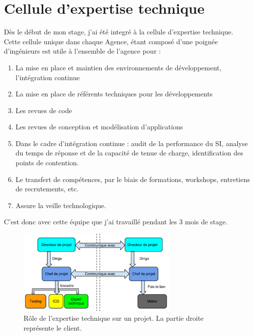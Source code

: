 \documentclass{report}
\begin{document}
\newpage






\section{Cellule d'expertise technique}

Dès le début de mon stage, j'ai été integré à la cellule d'expertise technique. Cette cellule unique dans chaque Agence, étant composé d'une poignée d'ingénieurs est utile à l'ensemble de l'agence pour : 

\begin{enumerate}
	\item La mise en place et maintien des environnements de développement, l'intégration continue
	\item La mise en place de référents techniques pour les développements
	\item Les revues de code 
	\item Les revues de conception et modélisation d’applications
	\item Dans le cadre d’intégration continue : audit de la performance du SI, analyse du temps de réponse et de la capacité de tenue de charge, identification des points de contention.
	\item Le transfert de compétences, par le biais de formations, workshops, entretiens de recrutements, etc.
	\item Assure la veille technologique. 
\end{enumerate}

C'est donc avec cette équipe que j'ai travaillé pendant les 3 mois de stage. 

\begin{figure}[h!]
	\centering
	\includegraphics[width=0.7\textwidth]{assets/expert_orga.png}
	\caption{Rôle de l'expertise technique sur un projet. La partie droite représente le client.}
\end{figure}
\end{document}
